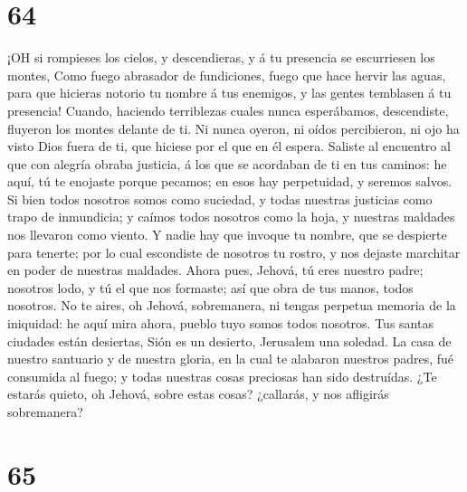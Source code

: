\hypertarget{section-63}{%
\section{64}\label{section-63}}

 ¡OH si rompieses los cielos, y descendieras, y á tu
presencia se escurriesen los montes,  Como fuego abrasador
de fundiciones, fuego que hace hervir las aguas, para que hicieras
notorio tu nombre á tus enemigos, y las gentes temblasen á tu presencia!
 Cuando, haciendo terriblezas cuales nunca esperábamos,
descendiste, fluyeron los montes delante de ti.  Ni nunca
oyeron, ni oídos percibieron, ni ojo ha visto Dios fuera de ti, que
hiciese por el que en él espera.  Saliste al encuentro al
que con alegría obraba justicia, á los que se acordaban de ti en tus
caminos: he aquí, tú te enojaste porque pecamos; en esos hay
perpetuidad, y seremos salvos.  Si bien todos nosotros somos
como suciedad, y todas nuestras justicias como trapo de inmundicia; y
caímos todos nosotros como la hoja, y nuestras maldades nos llevaron
como viento.  Y nadie hay que invoque tu nombre, que se
despierte para tenerte; por lo cual escondiste de nosotros tu rostro, y
nos dejaste marchitar en poder de nuestras maldades.  Ahora
pues, Jehová, tú eres nuestro padre; nosotros lodo, y tú el que nos
formaste; así que obra de tus manos, todos nosotros.  No te
aires, oh Jehová, sobremanera, ni tengas perpetua memoria de la
iniquidad: he aquí mira ahora, pueblo tuyo somos todos nosotros.
 Tus santas ciudades están desiertas, Sión es un desierto,
Jerusalem una soledad.  La casa de nuestro santuario y de
nuestra gloria, en la cual te alabaron nuestros padres, fué consumida al
fuego; y todas nuestras cosas preciosas han sido destruídas.
 ¿Te estarás quieto, oh Jehová, sobre estas cosas?
¿callarás, y nos afligirás sobremanera?

\hypertarget{section-64}{%
\section{65}\label{section-64}}

